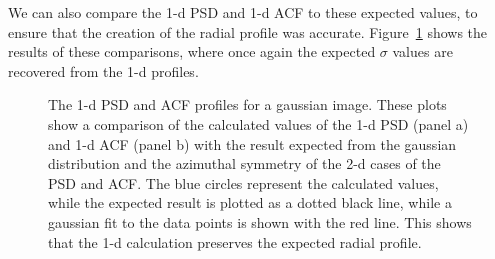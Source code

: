\documentclass[11pt,preprint]{aastex}
\begin{document}
We can also compare the 1-d PSD and 1-d ACF to these expected values, to ensure that the creation of the radial profile was accurate. Figure~\ref{fig:gauss_1d} shows the results of these comparisons, where once again the expected $\sigma$ values are recovered from the 1-d profiles. 

\begin{figure}[htb]
\centering
{}
\caption{{\small
The 1-d PSD and ACF profiles for a gaussian image. These plots show a comparison of the calculated values of the 1-d PSD (panel a) and 1-d ACF (panel b) with the result expected from the gaussian distribution and the azimuthal symmetry of the 2-d cases of the PSD and ACF. The blue circles represent the calculated values, while the expected result is plotted as a dotted black line, while a gaussian fit to the data points is shown with the red line.  This shows that the 1-d calculation preserves the expected radial profile. }}
\label{fig:gauss_1d}
\end{figure}
\end{document}
